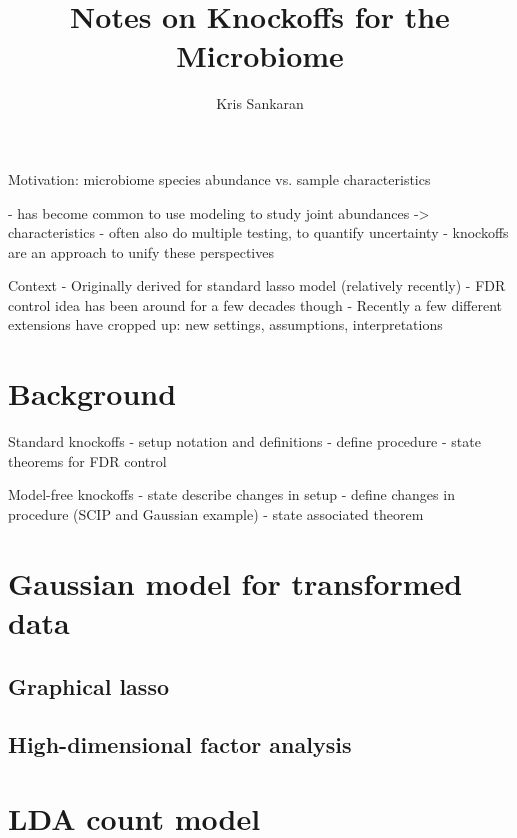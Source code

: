 \documentclass{article}
\title{Notes on Knockoffs for the Microbiome}
\author{Kris Sankaran}
\begin{document}
Motivation: microbiome species abundance vs. sample characteristics

- has become common to use modeling to study joint abundances -> characteristics
- often also do multiple testing, to quantify uncertainty
- knockoffs are an approach to unify these perspectives

Context
- Originally derived for standard lasso model (relatively recently)
- FDR control idea has been around for a few decades though
- Recently a few different extensions have cropped up: new settings,
assumptions, interpretations


\section{Background}
\label{sec:background}

Standard knockoffs
- setup notation and definitions
- define procedure
- state theorems for FDR control

Model-free knockoffs
- state describe changes in setup
- define changes in procedure (SCIP and Gaussian example)
- state associated theorem

\section{Gaussian model for transformed data}
\label{sec:mf_gaussian_model}

\subsection{Graphical lasso}
\label{subsec:graphical_lasso}


\subsection{High-dimensional factor analysis}
\label{subsec:factor_analysis}

\section{LDA count model}
\label{sec:lda_count_model}
\end{document}
